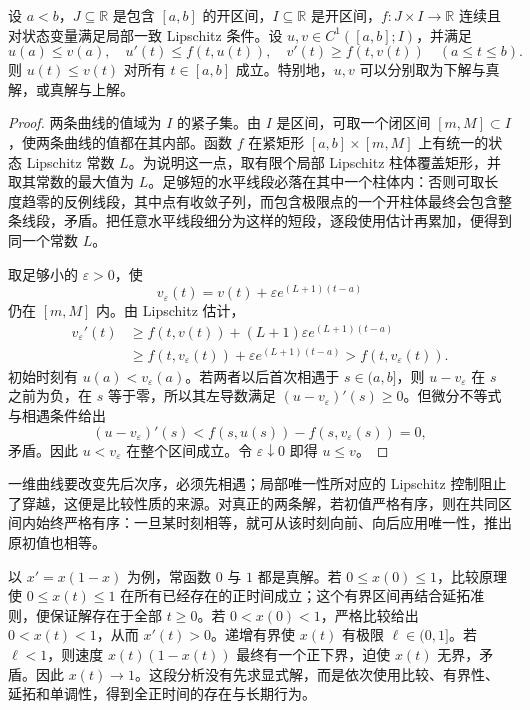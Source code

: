 \begin{theorem}[标量比较]\label{b2:thm:ode-scalar-comparison}
设 \(a<b\)，\(J\subseteq\mathbb R\) 是包含 \([a,b]\) 的开区间，\(I\subseteq\mathbb R\) 是开区间，\(f\colon J\times I\to\mathbb R\) 连续且对状态变量满足局部一致 Lipschitz 条件。设 \(u,v\in C^1([a,b];I)\)，并满足
\[
 u(a)\leq v(a),\quad
 u'(t)\leq f(t,u(t)),\quad v'(t)\geq f(t,v(t))
 \quad(a\leq t\leq b).
\]
则 \(u(t)\leq v(t)\) 对所有 \(t\in[a,b]\) 成立。特别地，\(u,v\) 可以分别取为下解与真解，或真解与上解。
\end{theorem}
\begin{proof}
两条曲线的值域为 \(I\) 的紧子集。由 \(I\) 是区间，可取一个闭区间 \([m,M]\subset I\)，使两条曲线的值都在其内部。函数 \(f\) 在紧矩形 \([a,b]\times[m,M]\) 上有统一的状态 Lipschitz 常数 \(L\)。为说明这一点，取有限个局部 Lipschitz 柱体覆盖矩形，并取其常数的最大值为 \(L\)。足够短的水平线段必落在其中一个柱体内：否则可取长度趋零的反例线段，其中点有收敛子列，而包含极限点的一个开柱体最终会包含整条线段，矛盾。把任意水平线段细分为这样的短段，逐段使用估计再累加，便得到同一个常数 \(L\)。

取足够小的 \(\varepsilon>0\)，使
\[
 v_\varepsilon(t)=v(t)+\varepsilon e^{(L+1)(t-a)}
\]
仍在 \([m,M]\) 内。由 Lipschitz 估计，
\[
 \begin{aligned}
 v_\varepsilon'(t)
 &\geq f(t,v(t))+(L+1)\varepsilon e^{(L+1)(t-a)}\\
 &\geq f(t,v_\varepsilon(t))
       +\varepsilon e^{(L+1)(t-a)}
 >f(t,v_\varepsilon(t)).
 \end{aligned}
\]
初始时刻有 \(u(a)<v_\varepsilon(a)\)。若两者以后首次相遇于 \(s\in(a,b]\)，则 \(u-v_\varepsilon\) 在 \(s\) 之前为负，在 \(s\) 等于零，所以其左导数满足 \((u-v_\varepsilon)'(s)\geq0\)。但微分不等式与相遇条件给出
\[
 (u-v_\varepsilon)'(s)
 <f(s,u(s))-f(s,v_\varepsilon(s))=0,
\]
矛盾。因此 \(u<v_\varepsilon\) 在整个区间成立。令 \(\varepsilon\downarrow0\) 即得 \(u\leq v\)。
\end{proof}

一维曲线要改变先后次序，必须先相遇；局部唯一性所对应的 Lipschitz 控制阻止了穿越，这便是比较性质的来源。对真正的两条解，若初值严格有序，则在共同区间内始终严格有序：一旦某时刻相等，就可从该时刻向前、向后应用唯一性，推出原初值也相等。

\ProseParagraphBreak
以 \(x'=x(1-x)\) 为例，常函数 \(0\) 与 \(1\) 都是真解。若 \(0\leq x(0)\leq1\)，比较原理使 \(0\leq x(t)\leq1\) 在所有已经存在的正时间成立；这个有界区间再结合延拓准则，便保证解存在于全部 \(t\geq0\)。若 \(0<x(0)<1\)，严格比较给出 \(0<x(t)<1\)，从而 \(x'(t)>0\)。递增有界使 \(x(t)\) 有极限 \(\ell\in(0,1]\)。若 \(\ell<1\)，则速度 \(x(t)(1-x(t))\) 最终有一个正下界，迫使 \(x(t)\) 无界，矛盾。因此 \(x(t)\to1\)。这段分析没有先求显式解，而是依次使用比较、有界性、延拓和单调性，得到全正时间的存在与长期行为。
